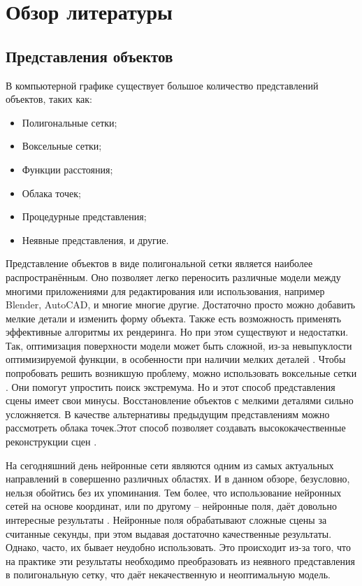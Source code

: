\documentclass[a4paper,hidelinks,12pt]{article}
\begin{document}
\newpage

\section{Обзор литературы}
\subsection{Представления объектов}
В компьютерной графике существует большое количество представлений объектов, таких как: 
\begin{itemize}
    \item Полигональные сетки;
    \item Воксельные сетки;
    \item Функции расстояния;
    \item Облака точек;
    \item Процедурные представления;
    \item Неявные представления, и другие.
\end{itemize}
Представление объектов в виде полигональной сетки является наиболее распространённым. Оно позволяет легко переносить различные модели между многими приложениями для редактирования или использования, например Blender, AutoCAD, и многие многие другие. Достаточно просто можно добавить мелкие детали и изменить форму объекта. Также есть возможность применять эффективные алгоритмы их рендеринга. Но при этом существуют и недостатки. Так, оптимизация поверхности модели может быть сложной, из-за невыпуклости оптимизируемой функции, в особенности при наличии мелких деталей \cite{garifullin2023diff} \cite{garifullin2024single}. Чтобы попробовать решить возникшую проблему, можно использовать воксельные сетки \cite{lombardi2019neural} \cite{vicini2021non}. Они помогут упростить поиск экстремума. Но и этот способ представления сцены имеет свои минусы. Восстановление объектов с мелкими деталями сильно усложняется. В качестве альтернативы предыдущим представлениям можно рассмотреть облака точек.Этот способ позволяет создавать высококачественные реконструкции сцен \cite{yifan2019differentiable} \cite{ruckert2022adop}.
\par
На сегодняшний день нейронные сети являются одним из самых актуальных направлений в совершенно различных областях. И в данном обзоре, безусловно, нельзя обойтись без их упоминания. Тем более, что использование нейронных сетей на основе координат, или по другому – нейронные поля, даёт довольно интересные результаты \cite{mildenhall2021nerf} \cite{fridovich2022plenoxels} \cite{muller2022instant}. Нейронные поля обрабатывают сложные сцены за считанные секунды, при этом выдавая достаточно качественные результаты. Однако, часто, их бывает неудобно использовать. Это происходит из-за того, что на практике эти результаты необходимо преобразовать из неявного представления в полигональную сетку, что даёт некачественную и неоптимальную модель.  
\end{document}
